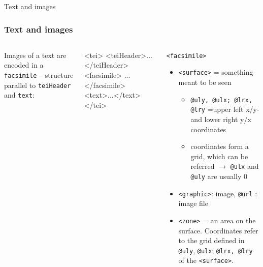 \begin{frame}{Text and images}
\subsubsection{Text and images}

\begin{columns}
Images of a text are encoded in a \texttt{facsimile} --
structure parallel to \texttt{teiHeader} and \texttt{text}:
\begin{xmlcode}
<tei>
  <teiHeader>...</teiHeader>
  <facsimile> ...</facsimile>
  <text>...</text>
</tei>
\end{xmlcode}

\begin{alertblock}{\texttt{<facsimile>}}\footnotesize
\begin{itemize}
\item  \texttt{<surface>} = something meant to be seen
\begin{itemize}
    \item \texttt{@uly, @ulx; @lrx, @lry} =upper left x/y- and lower right y/x coordinates
    \item  coordinates form a grid, which can be referred $\to$ \texttt{@ulx} and \texttt{@uly} are usually 0
\end{itemize}
    \item \texttt{<graphic>}: image, \texttt{@url} : image file
     \item  \texttt{<zone>} = an area on the surface. Coordinates refer to the grid defined in \texttt{@uly}, \texttt{@ulx}; \texttt{@lrx, @lry} of the \texttt{<surface>}.
\end{itemize}
\end{alertblock}
\end{columns}


\framebreak


\end{frame}
